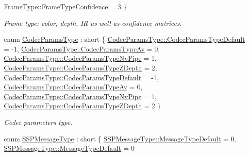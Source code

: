 \begin{DoxyCompactItemize}
\hyperlink{namespacemoetsi_1_1ssp_a46efdfa2cd5a28ead465dcc8006b5a87a1b85b2c60b857778932e29e0e5021ba1}{Frame\+Type\+::\+Frame\+Type\+Confidence} = 3
 \}\begin{DoxyCompactList}\small\item\em Frame type\+: color, depth, IR as well as confidence matrices. \end{DoxyCompactList}
\item 
enum \hyperlink{namespacemoetsi_1_1ssp_a6d638ba0bd38e9daded08f633d893563}{Codec\+Params\+Type} \+: short \{ \newline
\hyperlink{namespacemoetsi_1_1ssp_a6d638ba0bd38e9daded08f633d893563a1ffd3a6c06641b95d3e5142403ed0730}{Codec\+Params\+Type\+::\+Codec\+Params\+Type\+Default} = -\/1, 
\hyperlink{namespacemoetsi_1_1ssp_a6d638ba0bd38e9daded08f633d893563a55e78e5ce82b1d5dcfbb2381af26698f}{Codec\+Params\+Type\+::\+Codec\+Params\+Type\+Av} = 0, 
\hyperlink{namespacemoetsi_1_1ssp_a6d638ba0bd38e9daded08f633d893563ac818f912b0dd4cd2868a1a03d5c570a1}{Codec\+Params\+Type\+::\+Codec\+Params\+Type\+Nv\+Pipe} = 1, 
\hyperlink{namespacemoetsi_1_1ssp_a6d638ba0bd38e9daded08f633d893563a4e738f8ec62ed2fd5d5675f71b291992}{Codec\+Params\+Type\+::\+Codec\+Params\+Type\+Z\+Depth} = 2, 
\newline
\hyperlink{namespacemoetsi_1_1ssp_a6d638ba0bd38e9daded08f633d893563a1ffd3a6c06641b95d3e5142403ed0730}{Codec\+Params\+Type\+::\+Codec\+Params\+Type\+Default} = -\/1, 
\hyperlink{namespacemoetsi_1_1ssp_a6d638ba0bd38e9daded08f633d893563a55e78e5ce82b1d5dcfbb2381af26698f}{Codec\+Params\+Type\+::\+Codec\+Params\+Type\+Av} = 0, 
\hyperlink{namespacemoetsi_1_1ssp_a6d638ba0bd38e9daded08f633d893563ac818f912b0dd4cd2868a1a03d5c570a1}{Codec\+Params\+Type\+::\+Codec\+Params\+Type\+Nv\+Pipe} = 1, 
\hyperlink{namespacemoetsi_1_1ssp_a6d638ba0bd38e9daded08f633d893563a4e738f8ec62ed2fd5d5675f71b291992}{Codec\+Params\+Type\+::\+Codec\+Params\+Type\+Z\+Depth} = 2
 \}\begin{DoxyCompactList}\small\item\em Codec parameters type. \end{DoxyCompactList}
\item 
enum \hyperlink{namespacemoetsi_1_1ssp_a8948545ffe48a5b3507fd10a1e56d546}{S\+S\+P\+Message\+Type} \+: short \{ \hyperlink{namespacemoetsi_1_1ssp_a8948545ffe48a5b3507fd10a1e56d546a16d065ca1ae16532bc3115ec68734080}{S\+S\+P\+Message\+Type\+::\+Message\+Type\+Default} = 0, 
\hyperlink{namespacemoetsi_1_1ssp_a8948545ffe48a5b3507fd10a1e56d546a16d065ca1ae16532bc3115ec68734080}{S\+S\+P\+Message\+Type\+::\+Message\+Type\+Default} = 0

\end{DoxyCompactItemize}
